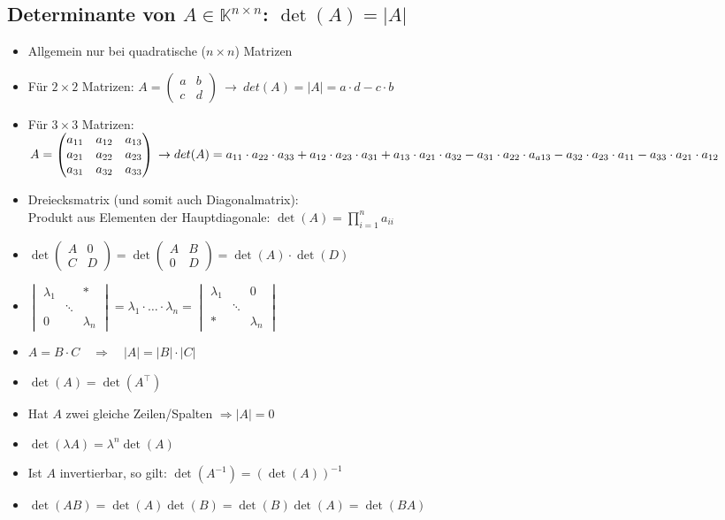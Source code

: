 \documentclass[6pt,a4paper]{scrartcl}
\newcommand{\C}{\ensuremath{\mathbb C}}
\begin{document}
\begin{multicols}{3}
\subsection{Determinante von $A\in \mathbb K^{n\times n}$: $\det(A)=|A|$}

\begin{itemize}\itemsep0pt
	\item Allgemein nur bei quadratische ($n \times n$) Matrizen
	\item Für $2 \times 2$ Matrizen: $A=\begin{pmatrix}	a & b \\ c & d 	\end{pmatrix} ~ \rightarrow ~ det(A)=|A|=a \cdot d - c \cdot b$
	\item Für $3 \times 3$ Matrizen: $A=\begin{pmatrix}
	a_{11} & a_{12} & a_{13} \\
	a_{21} & a_{22} & a_{23} \\
	a_{31} & a_{32} & a_{33}
	\end{pmatrix}
	\\\rightarrow det(A)=a_{11} \cdot a_{22} \cdot a_{33}+a_{12} \cdot a_{23} \cdot a_{31}+a_{13} \cdot a_{21} \cdot a_{32}-a_{31} \cdot a_{22} \cdot a_{a13}-a_{32} \cdot a_{23} \cdot a_{11}-a_{33} \cdot a_{21} \cdot a_{12}$
	\item Dreiecksmatrix (und somit auch Diagonalmatrix): \\
	Produkt aus Elementen der Hauptdiagonale: $\det(A)=\prod\limits_{i=1}^{n} a_{ii}$
	\item $\det\begin{pmatrix}A&0\\C&D\end{pmatrix}=\det\begin{pmatrix}A&B\\0&D\end{pmatrix}=\det(A)\cdot\det(D)$
	\item $\begin{vmatrix}\lambda_1&&* \\ &\ddots& \\ 0&&\lambda_n \end{vmatrix} = \lambda_1\cdot \ldots\cdot \lambda_n = \begin{vmatrix} \lambda_1&&0  \\  &\ddots& \\  *&&\lambda_n \end{vmatrix}$
	\item $A=B \cdot C \quad \Rightarrow \quad |A|=|B| \cdot |C|$
	\item $\det(A)=\det(A^\top)$
	\item Hat $A$ zwei gleiche Zeilen/Spalten $\Rightarrow |A|=0$
	\item $\det(\lambda A)=\lambda^n \det(A)$
	\item Ist $A$ invertierbar, so gilt: $\det(A^{-1})=(\det(A))^{-1}$
	\item $\det(AB) = \det(A) \det(B) = \det(B) \det(A) = \det(BA)$
\end{itemize}


\end{multicols}
\end{document}
